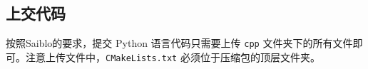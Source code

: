 \documentclass{article}
\begin{document}
\subsection{上交代码}

按照Saiblo的要求，提交 Python 语言代码只需要上传 \texttt{cpp} 文件夹下的所有文件即可。注意上传文件中，\texttt{CMakeLists.txt} 必须位于压缩包的顶层文件夹。
\end{document}
